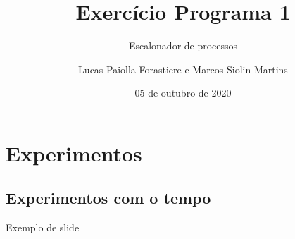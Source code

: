 \documentclass[10pt]{beamer}
\title{Exercício Programa 1}
\subtitle{Escalonador de processos}
\institute{IME-USP}
\author{Lucas Paiolla Forastiere e Marcos Siolin Martins}
\date{05 de outubro de 2020}
\begin{document}
    \maketitle
    \section{Experimentos}
    \subsection{Experimentos com o tempo}
    \begin{frame}{Exemplo de slide}
    \end{frame}
\end{document}
